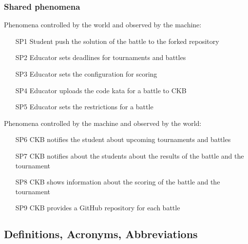 \subsubsection{Shared phenomena}
Phenomena controlled by the world and observed by the machine:
\begin{itemize}
    \item[SP1] Student push the solution of the battle to the forked repository
    \item[SP2] Educator sets deadlines for tournaments and battles
    \item[SP3] Educator sets the configuration for scoring
    \item[SP4] Educator uploads the code kata for a battle to CKB
    \item[SP5] Educator sets the restrictions for a battle    
\end{itemize}
Phenomena controlled by the machine and observed by the world:
\begin{itemize}
    \item[SP6] CKB notifies the student about upcoming tournaments and battles
    \item[SP7] CKB notifies about the students about the results of the battle and the tournament
    \item[SP8] CKB shows information about the scoring of the battle and the tournament
    \item[SP9] CKB provides a GitHub repository for each battle
\end{itemize}

\subsection{Definitions, Acronyms, Abbreviations}
